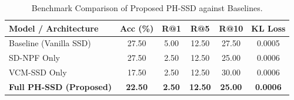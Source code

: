 \begin{table}[ht]
\centering
\caption{Benchmark Comparison of Proposed PH-SSD against Baselines.}
\label{tab:main_results}
\begin{tabular}{lccccc}
\toprule
Model / Architecture & Acc (\%) & R@1 & R@5 & R@10 & KL Loss \\
\midrule
Baseline (Vanilla SSD) & 27.50 & 5.00 & 12.50 & 27.50 & 0.0005 \\
SD-NPF Only & 27.50 & 2.50 & 12.50 & 25.00 & 0.0006 \\
VCM-SSD Only & 17.50 & 2.50 & 12.50 & 30.00 & 0.0006 \\
\textbf{Full PH-SSD (Proposed)} & \textbf{22.50} & \textbf{2.50} & \textbf{12.50} & \textbf{25.00} & \textbf{0.0006} \\
\bottomrule
\end{tabular}
\end{table}
